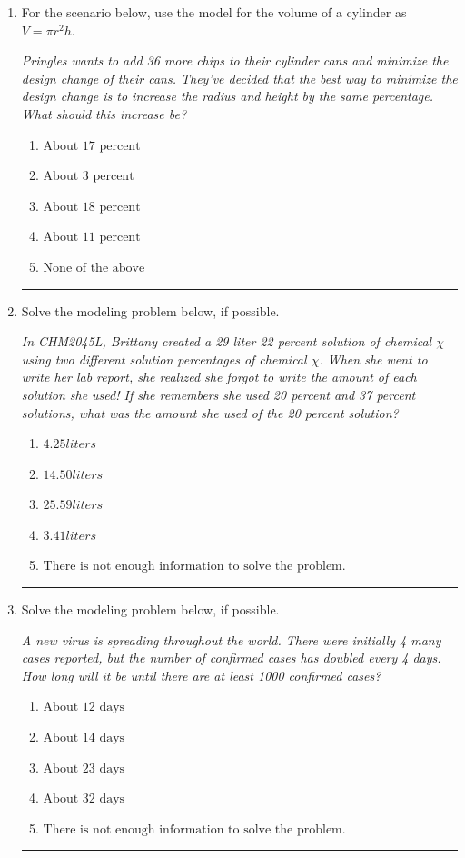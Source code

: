 \documentclass[14pt]{extbook}
\newcommand{\litem}[1]{\item#1\hspace*{-1cm}\rule{\textwidth}{0.4pt}}
\begin{document}
\begin{enumerate}
{\begin{enumerate}[label=\Alph*.]
\end{enumerate} }
\litem{
For the scenario below, use the model for the volume of a cylinder as $V = \pi r^2 h$.
\begin{center}
    \textit{ Pringles wants to add 36 \text{percent} more chips to their cylinder cans and minimize the design change of their cans. They've decided that the best way to minimize the design change is to increase the radius and height by the same percentage. What should this increase be? }
\end{center}
\begin{enumerate}[label=\Alph*.]
\item \( \text{About } 17 \text{ percent} \)
\item \( \text{About } 3 \text{ percent} \)
\item \( \text{About } 18 \text{ percent} \)
\item \( \text{About } 11 \text{ percent} \)
\item \( \text{None of the above} \)

\end{enumerate} }
\litem{
Solve the modeling problem below, if possible.
\begin{center}
    \textit{ In CHM2045L, Brittany created a 29 liter 22 percent solution of chemical $\chi$ using two different solution percentages of chemical $\chi$. When she went to write her lab report, she realized she forgot to write the amount of each solution she used! If she remembers she used 20 percent and 37 percent solutions, what was the amount she used of the 20 percent solution? }
\end{center}
\begin{enumerate}[label=\Alph*.]
\item \( 4.25 liters \)
\item \( 14.50 liters \)
\item \( 25.59 liters \)
\item \( 3.41 liters \)
\item \( \text{There is not enough information to solve the problem.} \)

\end{enumerate} }
\litem{
Solve the modeling problem below, if possible.
\begin{center}
    \textit{ A new virus is spreading throughout the world. There were initially 4 many cases reported, but the number of confirmed cases has doubled every 4 days. How long will it be until there are at least 1000 confirmed cases? }
\end{center}
\begin{enumerate}[label=\Alph*.]
\item \( \text{About } 12 \text{ days} \)
\item \( \text{About } 14 \text{ days} \)
\item \( \text{About } 23 \text{ days} \)
\item \( \text{About } 32 \text{ days} \)
\item \( \text{There is not enough information to solve the problem.} \)


\end{enumerate}}
\end{enumerate}
\end{document}
